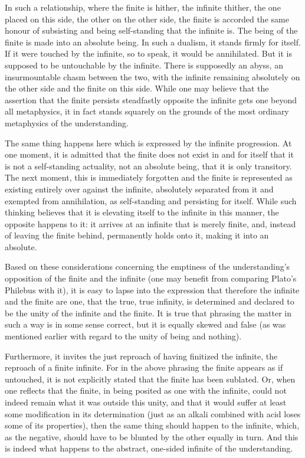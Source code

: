     In such a relationship, where the finite is hither, the infinite thither,
    the one placed on this side, the other on the other side,
    the finite is accorded the same honour of subsisting and
    being self-standing that the infinite is.
    The being of the finite is made into an absolute being.
    In such a dualism, it stands firmly for itself.
    If it were touched by the infinite,
    so to speak, it would be annihilated.
    But it is supposed to be untouchable by the infinite.
    There is supposedly an abyss,
    an insurmountable chasm between the two,
    with the infinite remaining absolutely on the other side
    and the finite on this side.
    While one may believe that the assertion
    that the finite persists steadfastly opposite the infinite
    gets one beyond all metaphysics,
    it in fact stands squarely on the grounds of
    the most ordinary metaphysics of the understanding.

    The same thing happens here which is expressed
    by the infinite progression.
    At one moment, it is admitted that the finite
    does not exist in and for itself
    that it is not a self-standing actuality,
    not an absolute being,
    that it is only transitory.
    The next moment, this is immediately forgotten
    and the finite is represented as existing entirely
    over against the infinite,
    absolutely separated from it
    and exempted from annihilation,
    as self-standing and persisting for itself.
    While such thinking believes that it is elevating itself
    to the infinite in this manner, the opposite happens to it:
    it arrives at an infinite that is merely finite,
    and, instead of leaving the finite behind,
    permanently holds onto it, making it into an absolute.

    Based on these considerations concerning the emptiness of
    the understanding's opposition of the finite and the infinite
    (one may benefit from comparing Plato's Philebus with it),
    it is easy to lapse into the expression that therefore
    the infinite and the finite are one, that the true,
    true infinity, is determined and declared to be
    the unity of the infinite and the finite.
    It is true that phrasing the matter in such a way is
    in some sense correct, but it is equally skewed and false
    (as was mentioned earlier with regard to the unity of being and nothing).

    Furthermore, it invites the just reproach of having
    finitized the infinite, the reproach of a finite infinite.
    For in the above phrasing the finite appears as if untouched,
    it is not explicitly stated that the finite has been sublated.
    Or, when one reflects that the finite, in being posited as one with the
    infinite, could not indeed remain what it was outside this unity, and
    that it would suffer at least some modification in its determination
    (just as an alkali combined with acid loses some of its properties),
    then the same thing should happen to the infinite, which, as the
    negative, should have to be blunted by the other equally in turn.
    And this is indeed what happens to the abstract, one-sided infinite
    of the understanding.

